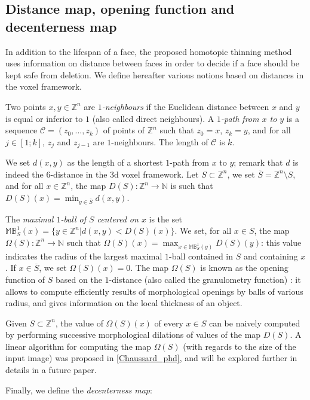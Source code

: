 \documentclass[final,envcountsame]{llncs}
\def\OneBall#1{\mathbb{B}^{1}_{#1}}
\def\MaxOneBall#1{\mathbb{M}\OneBall{#1}}
\def\mydist1{D}
\def\mydd1{\Omega}
\def\dist1{d}
\def\Dist1#1{\mydist1(#1)}
\def\DD1#1{\mydd1(#1)}
\def\myem#1{{\em #1}}
\def\Nset{\mathbb{N}}
\def\Zset{\Z}
\def\Nset{\mathbb{N}}
\def\Z{\mathbb{Z}}
\newcommand{\Compl}[1]{\overline{#1}}
\begin{document}
\subsection{Distance map, opening function and decenterness map}
\label{subsec::distmap}
In addition to the lifespan of a face, the proposed homotopic thinning method uses information on distance between faces in order to decide if a face should be kept safe from deletion. We define hereafter various notions based on distances in the voxel framework.

Two points $x,y \in \Zset^n$ are \myem{$1$-neighbours} if the Euclidean distance between $x$ and $y$ is equal or inferior to $1$ (also called direct neighbours). A \myem{$1$-path from $x$ to $y$} is a sequence $\mathcal{C}=(z_0,...,z_k)$ of points of $\Zset^n$ such that $z_0=x$, $z_k=y$, and for all $j \in [1;k]$, $z_j$ and $z_{j-1}$ are $1$-neighbours. The length of $\mathcal{C}$ is $k$. 

We set $\dist1(x,y)$ as the length of a shortest $1$-path from $x$ to $y$; remark that $\dist1$ is indeed the $6$-distance in the 3d voxel framework. Let $S \subset \Zset^n$, we set $\Compl{S} = \Zset^n \setminus S$, and for all $x \in \Zset^n$, the map $\Dist1{S}: \Zset^n \rightarrow \Nset$ is such that $\Dist1{S}(x) = \displaystyle \min_{y \in \Compl{S}} \dist1(x,y)$. 

The \myem{maximal $1$-ball of $S$ centered on $x$} is the set $\MaxOneBall{S}(x)=\{y \in \Zset^n | \dist1(x,y) < \Dist1{S}(x)\}$.
We set, for all $x \in S$, the map $\DD1{S}: \Zset^n \rightarrow \Nset$ such that $\DD1{S}(x) = \displaystyle \max_{x \in \MaxOneBall{S}(y)} \Dist1{S}(y)$: this value indicates the radius of the largest maximal $1$-ball contained in $S$ and containing $x$. If $x \in \Compl{S}$, we set $\DD1{S}(x) = 0$. The map $\DD1{S}$ is known as the opening function of $S$ based on the $1$-distance (also called the granulometry function) \cite{Matheron67}: it allows to compute efficiently results of morphological openings by balls of various radius, and gives information on the local thickness of an object.

Given $S \subset \Zset^n$, the value of $\DD1{S}(x)$ of every $x \in S$ can be naively computed by performing successive morphological dilations of values of the map $\Dist1{S}$. A linear algorithm for computing the map $\DD1{S}$ (with regards to the size of the input image) was proposed in \ref{Chaussard_phd}, and will be explored further in details in a future paper.


Finally, we define the \myem{decenterness map}:
\end{document}
